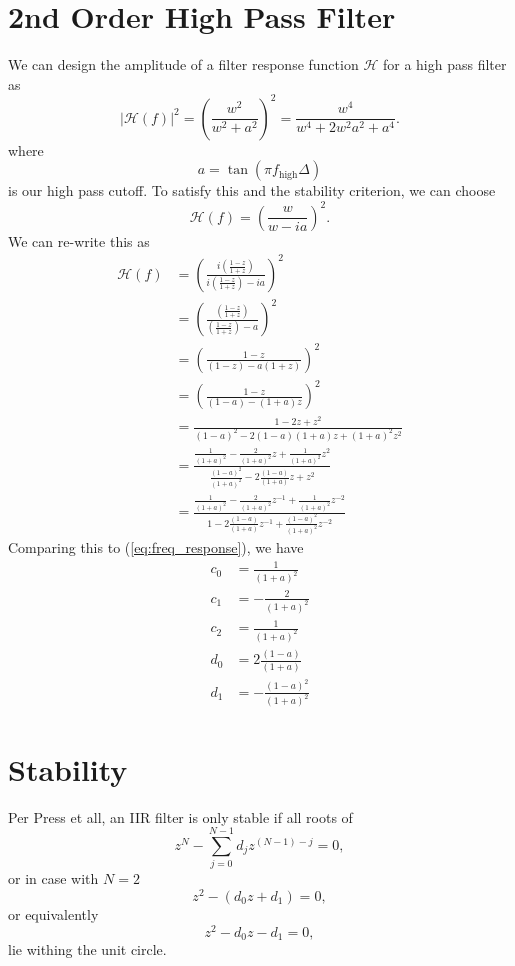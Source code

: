 \documentclass[a4paper]{article}
\begin{document}
\section{2nd Order High Pass Filter}
We can design the amplitude of a filter response function $\mathcal{H}$ for a high pass filter as
\begin{equation}
|\mathcal{H}(f)|^2 = \left(\frac{w^2}{w^2 + a^2}\right)^2 = \frac{w^4}{w^4 + 2 w^2a^2 + a^4}.
\end{equation}
where
\begin{equation}
a = \tan(\pi f_\textrm{high} \Delta)
\end{equation}
is our high pass cutoff.  To satisfy this and the stability criterion, we can choose
\begin{equation}
\mathcal{H}(f) = \left(\frac{w}{w - ia}\right)^2.
\end{equation}
We can re-write this as
\begin{align}
\mathcal{H}(f) & = \left(\frac{i \left(\frac{1-z}{1+z}\right)}{i \left(\frac{1-z}{1+z}\right) - ia}\right)^2 \\
 & = \left(\frac{ \left(\frac{1-z}{1+z}\right)}{ \left(\frac{1-z}{1+z}\right) - a}\right)^2 \\
 & = \left(\frac{1-z}{ (1-z) - a(1+z)}\right)^2 \\
 & = \left(\frac{1-z}{ (1-a) - (1+a)z}\right)^2 \\
 & = \frac{1-2 z + z^2}{ (1-a)^2 - 2 (1-a)(1+a)z + (1+a)^2 z^2 } \\
 & = \frac{\frac{1}{(1+a)^2}-\frac{2}{(1+a)^2} z + \frac{1}{(1+a)^2} z^2}{ \frac{(1-a)^2}{(1+a)^2} - 2 \frac{(1-a)}{(1+a)}z + z^2 } \\
& = \frac{\frac{1}{(1+a)^2} -\frac{2}{(1+a)^2} z^{-1} + \frac{1}{(1+a)^2} z^{-2}}{ 1 - 2 \frac{(1-a)}{(1+a)}z^{-1} + \frac{(1-a)^2}{(1+a)^2} z^{-2} }
\end{align}
Comparing this to (\ref{eq:freq_response}), we have
\begin{align}
c_0 &= \frac{1}{(1+a)^2} \\
c_1 &= -\frac{2}{(1+a)^2} \\
c_2 &= \frac{1}{(1+a)^2} \\
d_0 &= 2 \frac{(1-a)}{(1+a)} \\
d_1 &= -\frac{(1-a)^2}{(1+a)^2}
\end{align}

\section{Stability}
Per Press et all, an IIR filter is only stable if all roots of
\begin{equation}
z^N - \sum^{N-1}_{j=0} d_j z^{(N-1)-j} = 0,\label{eq:stability}
\end{equation}
or in case with $N=2$
\begin{equation}
z^2 - (d_0 z + d_1) = 0,
\end{equation}
or equivalently
\begin{equation}
z^2 - d_0 z - d_1 = 0,
\end{equation}
lie withing the unit circle.
\end{document}
